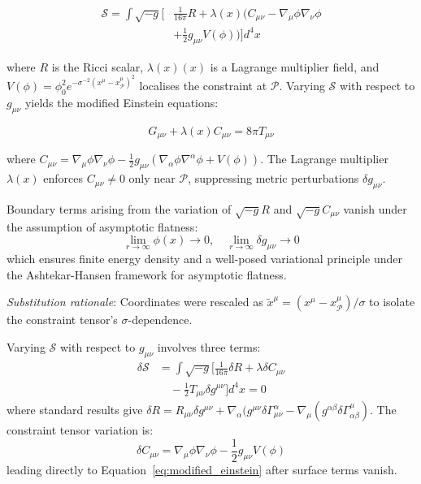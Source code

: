 \documentclass[twocolumn]{article}
\newcommand{\fpit}{\mathcal{P}}
\newcommand{\lagrange}{\lambda(x)}
\begin{document}
	\begin{equation}
		\begin{split}
			\mathcal{S} = \int \sqrt{-g} \bigg[ & \frac{1}{16\pi} R + \lagrange \bigg( C_{\mu\nu} - \nabla_\mu \phi \nabla_\nu \phi \\
			& + \frac{1}{2} g_{\mu\nu} V(\phi) \bigg) \bigg] d^4x
		\end{split}
	\end{equation}
	
	where \(R\) is the Ricci scalar, \(\lagrange(x)\) is a Lagrange multiplier field, and \(V(\phi) = \phi_0^2 e^{-\sigma^{-2}(x^\mu - x^\mu_\fpit)^2}\) localises the constraint at \(\fpit\). Varying \(\mathcal{S}\) with respect to \(g_{\mu\nu}\) yields the modified Einstein equations:
	
	\begin{equation}
		G_{\mu\nu} + \lagrange C_{\mu\nu} = 8\pi T_{\mu\nu}
\label{eq:modified_einstein}
	\end{equation}
	
	where \(C_{\mu\nu} = \nabla_\mu \phi \nabla_\nu \phi - \frac{1}{2} g_{\mu\nu} (\nabla_\alpha \phi \nabla^\alpha \phi + V(\phi))\). The Lagrange multiplier \(\lagrange\) enforces \(C_{\mu\nu} \neq 0\) only near \(\fpit\), suppressing metric perturbations \(\delta g_{\mu\nu}\).
	
	Boundary terms arising from the variation of $\sqrt{-g} R$ and $\sqrt{-g} C_{\mu\nu}$ vanish under the assumption of asymptotic flatness:
	\begin{equation}
		\lim_{r \to \infty} \phi(x) \to 0, \quad \lim_{r \to \infty} \delta g_{\mu\nu} \to 0
	\end{equation}
	which ensures finite energy density and a well-posed variational principle under the Ashtekar-Hansen framework for asymptotic flatness\cite{Ashtekar1978, Wald1984}.
	
	\emph{Substitution rationale}: Coordinates were rescaled as \(\tilde{x}^\mu = (x^\mu - x^\mu_\fpit)/\sigma\) to isolate the constraint tensor's \(\sigma\)-dependence.
	
	Varying $\mathcal{S}$ with respect to $g_{\mu\nu}$ involves three terms:
	\begin{equation}
		\begin{split}
			\delta\mathcal{S} &= \int \sqrt{-g} \bigg[ \frac{1}{16\pi} \delta R + \lambda \delta C_{\mu\nu} \\
			&\quad - \frac{1}{2} T_{\mu\nu} \delta g^{\mu\nu} \bigg] d^4x = 0
		\end{split}
	\end{equation}
	where standard results give $\delta R = R_{\mu\nu} \delta g^{\mu\nu} + \nabla_\alpha(g^{\mu\nu}\delta\Gamma^\alpha_{\mu\nu} - \nabla_\mu(g^{\alpha\beta}\delta\Gamma^\mu_{\alpha\beta})$\cite{Wald1984}. The constraint tensor variation is:
	\begin{equation}
		\delta C_{\mu\nu} = \nabla_\mu\phi\nabla_\nu\phi - \frac{1}{2}g_{\mu\nu}V(\phi)
	\end{equation}
	leading directly to Equation~\eqref{eq:modified_einstein} after surface terms vanish.
	
\end{document}
